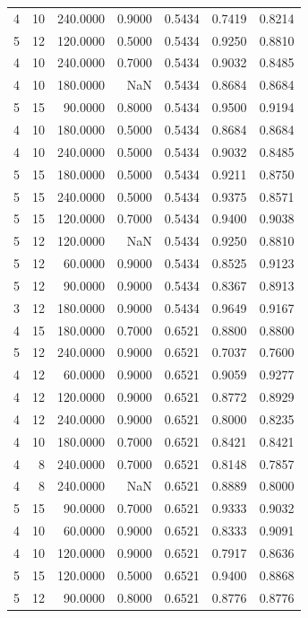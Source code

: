\begin{tabular}{rrrrrrr}
4 & 10 & 240.0000 & 0.9000 & 0.5434 & 0.7419 & 0.8214 \\
5 & 12 & 120.0000 & 0.5000 & 0.5434 & 0.9250 & 0.8810 \\
4 & 10 & 240.0000 & 0.7000 & 0.5434 & 0.9032 & 0.8485 \\
4 & 10 & 180.0000 & NaN & 0.5434 & 0.8684 & 0.8684 \\
5 & 15 & 90.0000 & 0.8000 & 0.5434 & 0.9500 & 0.9194 \\
4 & 10 & 180.0000 & 0.5000 & 0.5434 & 0.8684 & 0.8684 \\
4 & 10 & 240.0000 & 0.5000 & 0.5434 & 0.9032 & 0.8485 \\
5 & 15 & 180.0000 & 0.5000 & 0.5434 & 0.9211 & 0.8750 \\
5 & 15 & 240.0000 & 0.5000 & 0.5434 & 0.9375 & 0.8571 \\
5 & 15 & 120.0000 & 0.7000 & 0.5434 & 0.9400 & 0.9038 \\
5 & 12 & 120.0000 & NaN & 0.5434 & 0.9250 & 0.8810 \\
5 & 12 & 60.0000 & 0.9000 & 0.5434 & 0.8525 & 0.9123 \\
5 & 12 & 90.0000 & 0.9000 & 0.5434 & 0.8367 & 0.8913 \\
3 & 12 & 180.0000 & 0.9000 & 0.5434 & 0.9649 & 0.9167 \\
4 & 15 & 180.0000 & 0.7000 & 0.6521 & 0.8800 & 0.8800 \\
5 & 12 & 240.0000 & 0.9000 & 0.6521 & 0.7037 & 0.7600 \\
4 & 12 & 60.0000 & 0.9000 & 0.6521 & 0.9059 & 0.9277 \\
4 & 12 & 120.0000 & 0.9000 & 0.6521 & 0.8772 & 0.8929 \\
4 & 12 & 240.0000 & 0.9000 & 0.6521 & 0.8000 & 0.8235 \\
4 & 10 & 180.0000 & 0.7000 & 0.6521 & 0.8421 & 0.8421 \\
4 & 8 & 240.0000 & 0.7000 & 0.6521 & 0.8148 & 0.7857 \\
4 & 8 & 240.0000 & NaN & 0.6521 & 0.8889 & 0.8000 \\
5 & 15 & 90.0000 & 0.7000 & 0.6521 & 0.9333 & 0.9032 \\
4 & 10 & 60.0000 & 0.9000 & 0.6521 & 0.8333 & 0.9091 \\
4 & 10 & 120.0000 & 0.9000 & 0.6521 & 0.7917 & 0.8636 \\
5 & 15 & 120.0000 & 0.5000 & 0.6521 & 0.9400 & 0.8868 \\
5 & 12 & 90.0000 & 0.8000 & 0.6521 & 0.8776 & 0.8776 \\

\end{tabular}

